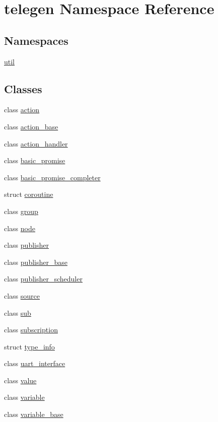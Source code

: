 \hypertarget{namespacetelegen}{}\section{telegen Namespace Reference}
\label{namespacetelegen}
\subsection*{Namespaces}
\begin{DoxyCompactItemize}
\item 
 \hyperlink{namespacetelegen_1_1util}{util}
\end{DoxyCompactItemize}
\subsection*{Classes}
\begin{DoxyCompactItemize}
\item 
class \hyperlink{classtelegen_1_1action}{action}
\item 
class \hyperlink{classtelegen_1_1action__base}{action\+\_\+base}
\item 
class \hyperlink{classtelegen_1_1action__handler}{action\+\_\+handler}
\item 
class \hyperlink{classtelegen_1_1basic__promise}{basic\+\_\+promise}
\item 
class \hyperlink{classtelegen_1_1basic__promise__completer}{basic\+\_\+promise\+\_\+completer}
\item 
struct \hyperlink{structtelegen_1_1coroutine}{coroutine}
\item 
class \hyperlink{classtelegen_1_1group}{group}
\item 
class \hyperlink{classtelegen_1_1node}{node}
\item 
class \hyperlink{classtelegen_1_1publisher}{publisher}
\item 
class \hyperlink{classtelegen_1_1publisher__base}{publisher\+\_\+base}
\item 
class \hyperlink{classtelegen_1_1publisher__scheduler}{publisher\+\_\+scheduler}
\item 
class \hyperlink{classtelegen_1_1source}{source}
\item 
class \hyperlink{classtelegen_1_1sub}{sub}
\item 
class \hyperlink{classtelegen_1_1subscription}{subscription}
\item 
struct \hyperlink{structtelegen_1_1type__info}{type\+\_\+info}
\item 
class \hyperlink{classtelegen_1_1uart__interface}{uart\+\_\+interface}
\item 
class \hyperlink{classtelegen_1_1value}{value}
\item 
class \hyperlink{classtelegen_1_1variable}{variable}
\item 
class \hyperlink{classtelegen_1_1variable__base}{variable\+\_\+base}
\end{DoxyCompactItemize}
